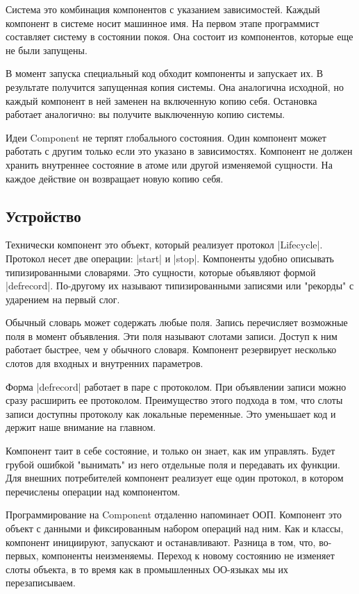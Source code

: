 Система это комбинация компонентов с указанием зависимостей. Каждый компонент в
системе носит машинное имя. На первом этапе программист составляет систему в
состоянии покоя. Она состоит из компонентов, которые еще не были запущены.

В момент запуска специальный код обходит компоненты и запускает их. В результате
получится запущенная копия системы. Она аналогична исходной, но каждый компонент
в ней заменен на включенную копию себя. Остановка работает аналогично: вы
получите выключенную копию системы.

Идеи Component не терпят глобального состояния. Один компонент может работать с
другим только если это указано в зависимостях. Компонент не должен хранить
внутреннее состояние в атоме или другой изменяемой сущности. На каждое действие
он возвращает новую копию себя.

\subsection{Устройство}

Технически компонент это объект, который реализует протокол
\spverb|Lifecycle|. Протокол несет две операции: \spverb|start| и \spverb|stop|. Компоненты удобно
описывать типизированными словарями. Это сущности, которые объявляют формой
\spverb|defrecord|. По-другому их называют типизированными записями или "рекорды" с
ударением на первый слог.

Обычный словарь может содержать любые поля. Запись перечисляет возможные поля в
момент объявления. Эти поля называют слотами записи. Доступ к ним работает
быстрее, чем у обычного словаря. Компонент резервирует несколько слотов для
входных и внутренних параметров.

Форма \spverb|defrecord| работает в паре с протоколом. При объявлении записи можно
сразу расширить ее протоколом. Преимущество этого подхода в том, что слоты
записи доступны протоколу как локальные переменные. Это уменьшает код и держит
наше внимание на главном.

Компонент таит в себе состояние, и только он знает, как им управлять. Будет
грубой ошибкой "вынимать" из него отдельные поля и передавать их функции. Для
внешних потребителей компонент реализует еще один протокол, в котором
перечислены операции над компонентом.

Программирование на Component отдаленно напоминает ООП. Компонент это объект с
данными и фиксированным набором операций над ним. Как и классы, компонент
инициируют, запускают и останавливают. Разница в том, что, во-первых, компоненты
неизменяемы. Переход к новому состоянию не изменяет слоты объекта, в то время
как в промышленных ОО-языках мы их перезаписываем.

